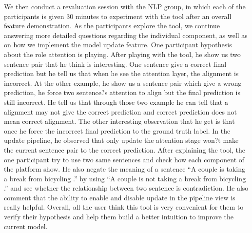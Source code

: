 We then conduct a revaluation session with the NLP group, in which each of the participants is given 30 minutes to experiment with the tool after an overall feature demonstration. As the participants explore the tool, we continue answering more detailed questions regarding the individual component, as well as on how we implement the model update feature.
%
One participant hypothesis about the role attention is playing. After playing with the tool, he show us two sentence pair that he think is interesting. One sentence give a correct final prediction but he tell us that when he see the attention layer, the alignment is incorrect. At the other example, he show us a sentence pair which give a wrong prediction, he force two sentence?s attention to align but the final prediction is still incorrect. He tell us that through those two example  he can tell that a alignment may not give the correct prediction and correct prediction does not mean correct alignment. 
%
The other interesting observation that he get is that once he force the incorrect final prediction to the ground truth label. In the update pipeline,  he observed that only update the attention stage won?t make the current sentence pair to the correct prediction. 
%
After explaining the tool, the one participant try to use two same sentences and check how each component of the platform show. He also negate the meaning of a sentence ``A couple is taking a break from bicycling .''  by using ``A couple is not taking a break from bicycling .'' and see whether the relationship between two sentence is contradiction. He also comment that the ability to enable and disable update in the pipeline view is really helpful.
%
Overall, all the user think this tool is very convenient for them to verify their hypothesis and help them build a better intuition to improve the current model.


